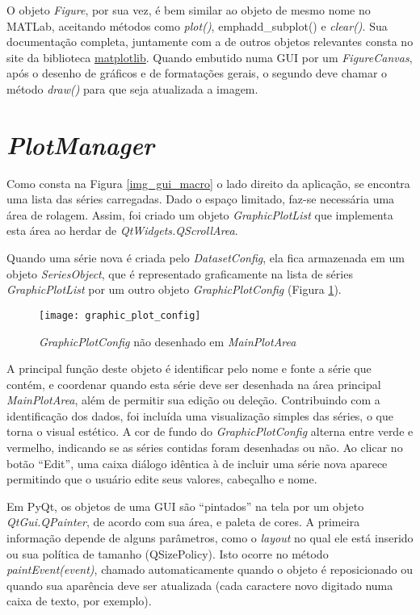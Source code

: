 O objeto \emph{Figure}, por sua vez, é bem similar ao objeto de mesmo nome no MATLab\textsuperscript{\tiny \textregistered}, aceitando métodos como \emph{plot()}, emph{add\_subplot()} e \emph{clear()}. Sua documentação completa, juntamente com a de outros objetos relevantes consta no site da biblioteca \href{https://matplotlib.org/}{matplotlib}. Quando embutido numa GUI por um \emph{FigureCanvas}, após o desenho de gráficos e de formatações gerais, o segundo deve chamar o método \emph{draw()} para que seja atualizada a imagem.


\section{\emph{PlotManager}}

Como consta na Figura \ref{img_gui_macro} o lado direito da aplicação, se encontra uma lista das séries carregadas. Dado o espaço limitado, faz-se necessária uma área de rolagem. Assim, foi criado um objeto \emph{GraphicPlotList} que implementa esta área ao herdar de \emph{QtWidgets.QScrollArea}.

Quando uma série nova é criada pelo \emph{DatasetConfig}, ela fica armazenada em um objeto \emph{SeriesObject}, que é representado graficamente na lista de séries \emph{GraphicPlotList} por um outro objeto \emph{GraphicPlotConfig} (Figura \ref{img_graphic_plot_config}).

\begin{figure}[hbt]
	\centering
	\caption{\emph{GraphicPlotConfig} não desenhado em \emph{MainPlotArea}}
	\texttt{[image: graphic\_plot\_config]}
	\label{img_graphic_plot_config}
\end{figure}

A principal função deste objeto é identificar pelo nome e fonte a série que contém, e coordenar quando esta série deve ser desenhada na área principal \emph{MainPlotArea}, além de permitir sua edição ou deleção. Contribuindo com a identificação dos dados, foi incluída uma visualização simples das séries, o que torna o visual estético. A cor de fundo do \emph{GraphicPlotConfig} alterna entre verde e vermelho, indicando se as séries contidas foram desenhadas ou não. Ao clicar no botão “Edit”, uma caixa diálogo idêntica à de incluir uma série nova aparece permitindo que o usuário edite seus valores, cabeçalho e nome.

Em PyQt, os objetos de uma GUI são “pintados” na tela por um objeto \emph{QtGui.QPainter}, de acordo com sua área, e paleta de cores. A primeira informação depende de alguns parâmetros, como o \textit{layout} no qual ele está inserido ou sua política de tamanho (QSizePolicy). Isto ocorre no método \emph{paintEvent(event)}, chamado automaticamente quando o objeto é reposicionado ou quando sua aparência deve ser atualizada (cada caractere novo digitado numa caixa de texto, por exemplo).

